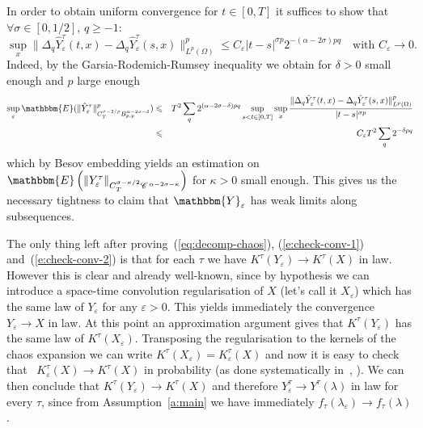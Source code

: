 In order to obtain uniform convergence for $t \in [0, T]$ it suffices to show
that $\forall \sigma \in [0, 1 / 2]$, $q \geqslant - 1$:
\begin{equation}
  \sup_x  \| \Delta_q \hat{Y}_{\varepsilon}^{\tau} (t, x) - \Delta_q
  \hat{Y}_{\varepsilon}^{\tau} (s, x) \|^p_{L^p (\Omega)} \leqslant
  C_{\varepsilon} | t - s |^{\sigma p} 2^{- (\alpha - 2 \sigma) pq} \quad
  \text{with $C_{\varepsilon} \rightarrow 0$} . \label{e:check-conv-2}
\end{equation}
Indeed, by the Garsia-Rodemich-Rumsey inequality we obtain for $\delta > 0$
small enough and $p$ large enough
\begin{eqnarray*}
  \sup_{\varepsilon} \mathbbm{E} (\| \hat{Y}_{\varepsilon}^{\tau}
  \|^p_{C_T^{\sigma - 2 / p} B^{\alpha - 2 \sigma - \delta}_{p, p}}) &
  \leqslant & T^2 \sum_q 2^{(\alpha - 2 \sigma - \delta) pq} \sup_{s < t \in
  [0, T]} \sup_x \frac{\| \Delta_q \hat{Y}_{\varepsilon}^{\tau} (t, x) -
  \Delta_q \hat{Y}_{\varepsilon}^{\tau} (s, x) \|_{L^p (\Omega)}^p}{| t - s
  |^{\sigma p}}\\
  & \leqslant & C_{\varepsilon} T^2 \sum_q 2^{- \delta pq}
\end{eqnarray*}
which by Besov embedding yields an estimation on $\mathbbm{E} \left( \|
Y_{\varepsilon}^{\tau} \|_{C_T^{\sigma - \kappa / 2} \CC^{\alpha - 2 \sigma -
\kappa}} \right)$ for $\kappa > 0$ small enough. This gives us the necessary
tightness to claim that $\mathbbm{Y}_{\varepsilon}$ has weak limits along
subsequences.

The only thing left after proving~(\ref{eq:decomp-chaos}),
(\ref{e:check-conv-1}) and~(\ref{e:check-conv-2}) is that for each $\tau$ we
have $K^{\tau} (Y_{\varepsilon}) \rightarrow K^{\tau} (X)$ in law. However
this is clear and already well-known, since by hypothesis we can introduce a
space-time convolution regularisation of $X$ (let's call it $X_{\varepsilon}$)
which has the same law of $Y_{\varepsilon}$ for any $\varepsilon > 0$. This
yields immediately the convergence $Y_{\varepsilon} \rightarrow X$ in law. At
this point an approximation argument gives that $K^{\tau} (Y_{\varepsilon})$
has the same law of $K^{\tau} (X_{\varepsilon})$. Transposing the
regularisation to the kernels of the chaos expansion we can write $K^{\tau}
(X_{\varepsilon}) = K_{\varepsilon}^{\tau} (X)$ and now it is easy to check
that \ $K_{\varepsilon}^{\tau} (X) \rightarrow K^{\tau} (X)$ in probability
(as done systematically in~{\cite{catellier_paracontrolled_2013}},
{\cite{mourrat_construction_2016}}). We can then conclude that $K^{\tau}
(Y_{\varepsilon}) \rightarrow K^{\tau} (X)$ and therefore
$Y^{\tau}_{\varepsilon} \rightarrow Y^{\tau} (\lambda)$ in law for every
$\tau$, since from Assumption~\ref{a:main} we have immediately $f_{\tau}
(\lambda_{\varepsilon}) \rightarrow f_{\tau} (\lambda)$.


